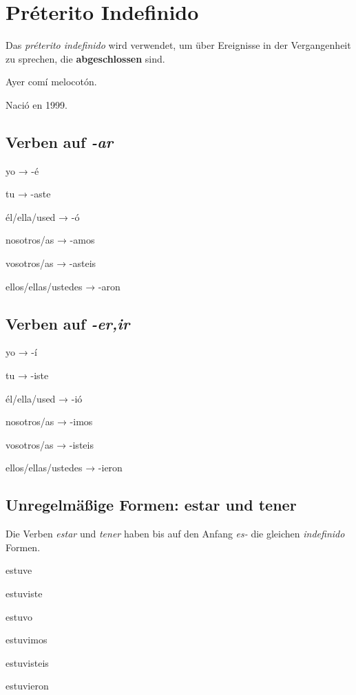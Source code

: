 \section{Pr\'eterito Indefinido}
Das \textit{pr\'eterito indefinido} wird verwendet, um
über Ereignisse in der Vergangenheit zu sprechen, die
\textbf{abgeschlossen} sind.
\begin{ejemplos}
    \item Ayer com\'i melocot\'on.
    \item Naci\'o en 1999.
\end{ejemplos}
\subsection*{Verben auf \textit{-ar}}
\begin{gramatica}
    \item yo → -\'e
    \item tu → -aste
    \item \'el/ella/used → -\'o
    \item nosotros/as → -amos
    \item vosotros/as → -asteis
    \item ellos/ellas/ustedes → -aron
\end{gramatica}
\subsection*{Verben auf \textit{-er,ir}}
\begin{gramatica}
    \item yo → -\'i
    \item tu → -iste
    \item \'el/ella/used → -i\'o
    \item nosotros/as → -imos
    \item vosotros/as → -isteis
    \item ellos/ellas/ustedes → -ieron
\end{gramatica}
\subsection*{Unregelmäßige Formen: estar und tener}
Die Verben \textit{estar} und \textit{tener} haben bis auf den Anfang 
\textit{es-} die gleichen \textit{indefinido} Formen.
\begin{gramatica}
    \item estuve
    \item estuviste
    \item estuvo
    \item estuvimos
    \item estuvisteis
    \item estuvieron
\end{gramatica}

